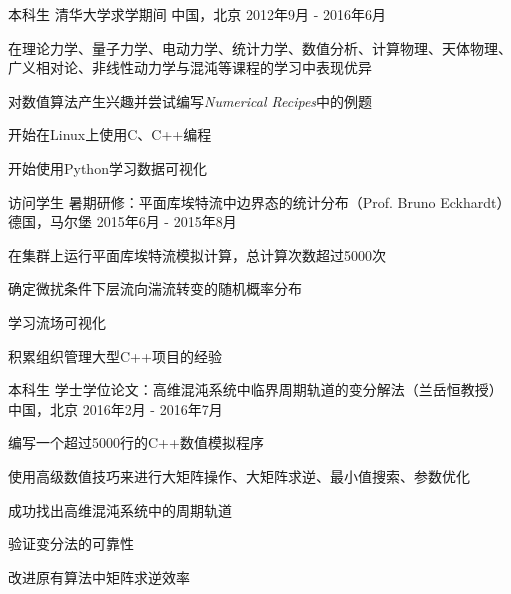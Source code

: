 

\begin{cventries}

  \cventry
    {本科生} %
    {清华大学求学期间} %
    {中国，北京} %
    {2012年9月 - 2016年6月} %
    {
      \begin{cvitems} %
        \item {在理论力学、量子力学、电动力学、统计力学、数值分析、计算物理、天体物理、广义相对论、非线性动力学与混沌等课程的学习中表现优异}
        \item {对数值算法产生兴趣并尝试编写\textit{Numerical Recipes}中的例题}
        \item {开始在Linux上使用C、C++编程}
        \item {开始使用Python学习数据可视化}
      \end{cvitems}
    }

  \cventry
    {访问学生} %
    {暑期研修：平面库埃特流中边界态的统计分布（Prof. Bruno Eckhardt）} %
    {德国，马尔堡} %
    {2015年6月 - 2015年8月} %
    {
      \begin{cvitems} %
        \item {在集群上运行平面库埃特流模拟计算，总计算次数超过5000次}
        \item {确定微扰条件下层流向湍流转变的随机概率分布}
        \item {学习流场可视化}
        \item {积累组织管理大型C++项目的经验}
      \end{cvitems}
    }

  \cventry
    {本科生} %
    {学士学位论文：高维混沌系统中临界周期轨道的变分解法（兰岳恒教授）} %
    {中国，北京} %
    {2016年2月 - 2016年7月} %
    {
      \begin{cvitems} %
        \item {编写一个超过5000行的C++数值模拟程序}
        \item {使用高级数值技巧来进行大矩阵操作、大矩阵求逆、最小值搜索、参数优化}
        \item {成功找出高维混沌系统中的周期轨道}
        \item {验证变分法的可靠性}
        \item {改进原有算法中矩阵求逆效率}
      \end{cvitems}
    }


\end{cventries}
